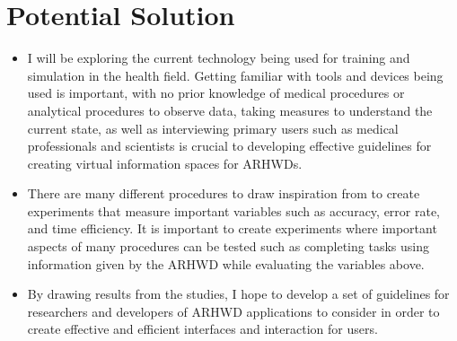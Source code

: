 \section{Potential Solution }
\label{sec:potentialsolution}
\begin{itemize}
	\item I will be exploring the current technology being used for training and simulation in the health field. Getting familiar with tools and devices being used is important, with no prior knowledge of medical procedures or analytical procedures to observe data, taking measures to understand the current state, as well as interviewing primary users such as medical professionals and scientists is crucial to developing effective guidelines for creating virtual information spaces for ARHWDs.
	\item There are many different procedures to draw inspiration from to create experiments that measure important variables such as accuracy, error rate, and time efficiency. It is important to create experiments where important aspects of many procedures can be tested such as completing tasks using information given by the ARHWD while evaluating the variables above. 
	\item By drawing results from the studies, I hope to develop a set of guidelines for researchers and developers of ARHWD applications to consider in order to create effective and efficient interfaces and interaction for users.
\end{itemize}